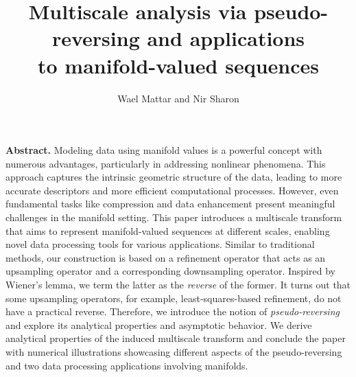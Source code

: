 \documentclass[12pt]{article}
\title{
Multiscale analysis via pseudo-reversing and applications \\ to manifold-valued sequences
}
\author{Wael Mattar and Nir Sharon}
\date{}
\begin{document}
\maketitle

\noindent\makebox[\linewidth]{\rule{\textwidth}{1pt}}

\textbf{Abstract.} Modeling data using manifold values is a powerful concept with numerous advantages, particularly in addressing nonlinear phenomena. This approach captures the intrinsic geometric structure of the data, leading to more accurate descriptors and more efficient computational processes. However, even fundamental tasks like compression and data enhancement present meaningful challenges in the manifold setting. This paper introduces a multiscale transform that aims to represent manifold-valued sequences at different scales, enabling novel data processing tools for various applications. Similar to traditional methods, our construction is based on a refinement operator that acts as an upsampling operator and a corresponding downsampling operator. Inspired by Wiener’s lemma, we term the latter as the \emph{reverse} of the former. It turns out that some upsampling operators, for example, least-squares-based refinement, do not have a practical reverse. Therefore, we introduce the notion of \emph{pseudo-reversing} and explore its analytical properties and asymptotic behavior. We derive analytical properties of the induced multiscale transform and conclude the paper with numerical illustrations showcasing different aspects of the pseudo-reversing and two data processing applications involving manifolds.


\end{document}
